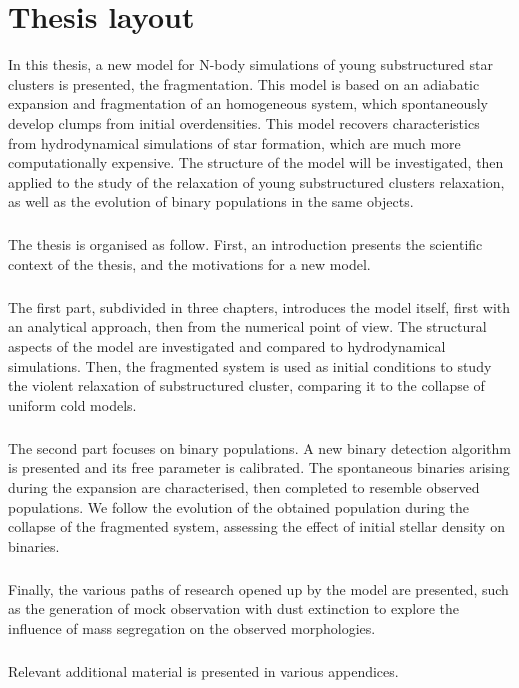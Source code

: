 
\chapter*{Thesis layout}

In this thesis, a new model for N-body simulations of young substructured star clusters is presented, the \HubLem fragmentation. This model is based on an adiabatic expansion and fragmentation of an homogeneous system, which spontaneously develop clumps from initial overdensities. This model recovers characteristics from hydrodynamical simulations of star formation, which are much more computationally expensive. The structure of the \HubLem model will be investigated, then applied to the study of the relaxation of young substructured clusters relaxation, as well as the evolution of binary populations in the same objects. 

\paragraph*{}
The thesis is organised as follow. First, an introduction presents the scientific context of the thesis, and the motivations for a new model. 

\paragraph*{}
The first part, subdivided in three chapters, introduces the \HubLem model itself, first with an analytical approach, then from the numerical point of view. The structural aspects of the model are investigated and compared to hydrodynamical simulations. Then, the fragmented system is used as initial conditions to study the violent relaxation of substructured cluster, comparing it to the collapse of uniform cold models.

\paragraph*{}
The second part focuses on binary populations. A new binary detection algorithm is presented and its free parameter is calibrated. The spontaneous binaries arising during the \HubLem expansion are characterised, then completed to resemble observed populations. We follow the evolution of the obtained population during the collapse of the fragmented system, assessing the effect of initial stellar density on binaries.

\paragraph*{}
Finally,  the various paths of research opened up by the \HubLem model are presented, such as the generation of mock observation with dust extinction to explore the influence of mass segregation on the observed morphologies.%

\paragraph*{}
Relevant additional material is presented in various appendices. 